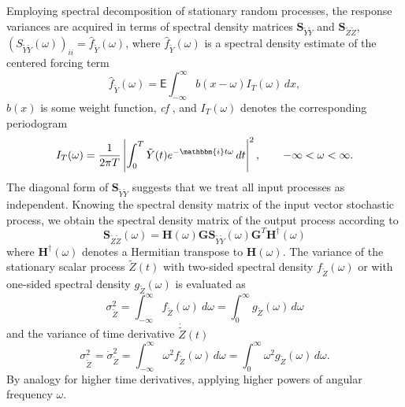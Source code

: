 \documentclass[preprint,12pt,authoryear]{elsarticle}
\newcommand{\bs}[1]{{\boldsymbol{#1}}}
\begin{document}
Employing spectral decomposition of stationary random processes, the response variances are acquired in terms of spectral density matrices $\bs{S}_{\tilde{Y}\tilde{Y}}$ and $\bs{S}_{\tilde{Z}\tilde{Z}}$, $(S_{\tilde{Y}\tilde{Y}}(\omega))_{ii}=\hat{f}_{\tilde{Y}}(\omega)$, where $\hat{f}_{\tilde{Y}}(\omega)$ is a spectral density estimate of the centered forcing term
\begin{equation}
\hat{f}_{\tilde{Y}}(\omega)=\mathsf{E}\int_{-\infty}^\infty b(x-\omega)I_T(\omega)\,dx,
\label{2eq17}
\end{equation}
$b(x)$ is some weight function, \textit{cf} \citep{Andel}, and $I_{T}(\omega)$ denotes the corresponding periodogram
\begin{equation}
I_T(\omega)=\frac{1}{2\pi T}\left|\int_0^T \tilde{Y}(t)e^{-\mathbbm{i}t\omega}\,dt\right|^2, \qquad -\infty<\omega<\infty.
\label{2eq18}
\end{equation}
The diagonal form of $\bs{S}_{\tilde{Y}\tilde{Y}}$ suggests that we treat all input processes as independent. Knowing the spectral density matrix of the input vector stochastic process, we obtain the spectral density matrix of the output process according to \cite{Soong}
\begin{equation}
\bs{S}_{\tilde{Z}\tilde{Z}}(\omega)=\bs{H}(\omega)\bs{GS}_{\tilde{Y}\tilde{Y}}(\omega)\bs{G}^T\bs{H}^{\dagger}(\omega)
\label{2eq19}
\end{equation}
where $\bs{H}^{\dagger}(\omega)$ denotes a Hermitian transpose to $\bs{H}(\omega)$. The variance of the stationary scalar process $\tilde{Z}(t)$ with two-sided spectral density $f_{\tilde{Z}}(\omega)$ or with one-sided spectral density $g_{\tilde{Z}}(\omega)$ is evaluated as
\begin{equation}
\sigma_{\tilde{Z}}^2=\int_{-\infty}^\infty f_{\tilde{Z}}(\omega)\ d\omega=\int_{0}^\infty g_{\tilde{Z}}(\omega)\,d\omega
\label{2eq20}
\end{equation}
and the variance of time derivative $\dot{\tilde{Z}}(t)$
\begin{equation}
\sigma_{\dot{{\tilde{Z}}}}^2=\dot{\sigma}_{\tilde{Z}}^2=\int_{-\infty}^\infty \omega^2f_{\tilde{Z}}(\omega)\,d\omega=\int_{0}^\infty \omega^2g_{\tilde{Z}}(\omega)\,d\omega.
\label{2eq21}
\end{equation}
By analogy for higher time derivatives, applying higher powers of angular frequency $\omega$.
\end{document}
